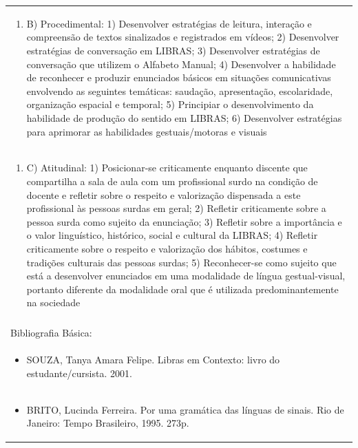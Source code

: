 \documentclass[11pt]{article}
\begin{document}
\begin{center}
\begin{longtable}{|p{4cm}|p{4cm}|p{4cm}|p{4cm}|}
\multicolumn{4}{|p{\dimexpr 16cm + 6\tabcolsep\relax}|}{\begin{enumerate}[start=2]\item B) Procedimental: 1) Desenvolver estratégias de leitura, interação e compreensão de textos sinalizados e registrados em vídeos; 2) Desenvolver estratégias de conversação em LIBRAS; 3) Desenvolver estratégias de conversação que utilizem o Alfabeto Manual; 4) Desenvolver a habilidade de reconhecer e produzir enunciados básicos em situações comunicativas envolvendo as seguintes temáticas: saudação, apresentação, escolaridade, organização espacial e temporal; 5) Principiar o desenvolvimento da habilidade de produção do sentido em LIBRAS; 6) Desenvolver estratégias para aprimorar as habilidades gestuais/motoras e visuais\end{enumerate}}\\
\multicolumn{4}{|p{\dimexpr 16cm + 6\tabcolsep\relax}|}{\begin{enumerate}[start=3]\item C) Atitudinal: 1) Posicionar-se criticamente enquanto discente que compartilha a sala de aula com um profissional surdo na condição de docente e refletir sobre o respeito e valorização dispensada a este profissional às pessoas surdas em geral; 2) Refletir criticamente sobre a pessoa surda como sujeito da enunciação; 3) Refletir sobre a importância e o valor linguístico, histórico, social e cultural da LIBRAS; 4) Refletir criticamente sobre o respeito e valorização dos hábitos, costumes e tradições culturais das pessoas surdas; 5) Reconhecer-se como sujeito que está a desenvolver enunciados em uma modalidade de língua gestual-visual, portanto diferente da modalidade oral que é utilizada predominantemente na sociedade\end{enumerate}}\\
\multicolumn{4}{|p{\dimexpr 16cm + 6\tabcolsep\relax}|}{}\\
\hline
\multicolumn{4}{|p{16cm}|}{Bibliografia Básica:}\\*
\multicolumn{4}{|p{\dimexpr 16cm + 6\tabcolsep\relax}|}{\begin{itemize}\item SOUZA, Tanya Amara Felipe. Libras em Contexto: livro do estudante/cursista. 2001.\end{itemize}}\\
\multicolumn{4}{|p{\dimexpr 16cm + 6\tabcolsep\relax}|}{\begin{itemize}\item BRITO, Lucinda Ferreira. Por uma gramática das línguas de sinais. Rio de Janeiro: Tempo Brasileiro, 1995. 273p.\end{itemize}}\\

\end{longtable}
\end{center}
\end{document}
